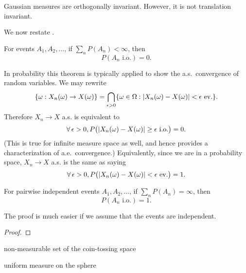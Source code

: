 Gaussian measures are orthogonally invariant. However, it is not translation invariant.

\begin{namedthm}
    
\end{namedthm}

We now restate .

\begin{namedthm} \label{thm:BorelCantelli-1-prob}
    For events $A_1,A_2,\dotsc$, if $\sum_n P(A_n) < \infty$, then \[
        P(A_n \text{ i.o.}) = 0.
    \]
\end{namedthm}

In probability this theorem is typically applied to show the a.s.\ convergence of random variables. We may rewrite \[
    \{\omega: X_n(\omega) \to X(\omega)\} = \bigcap_{\epsilon >0}\{\omega \in \Omega: \lvert X_n(\omega) - X(\omega) \rvert < \epsilon\text{ ev.}\}.
\] Therefore $X_n \to X$ a.s. is equivalent to \[
    \forall\,\epsilon >0, P\bigl(\lvert X_n(\omega) - X(\omega) \rvert \geq \epsilon\text{ i.o.}\bigr) = 0.
\] (This is true for infinite measure space as well, and hence provides a characterization of a.e.\ convergence.) Equivalently, since we are in a probability space, $X_n \to X$ a.s. is the same as saying \[
    \forall\,\epsilon >0, P\bigl(\lvert X_n(\omega) - X(\omega) \rvert < \epsilon\text{ ev.}\bigr) = 1.
\]

\begin{namedthm}
    For pairwise independent events $A_1,A_2,\dotsc$, if $\sum_n P(A_n) = \infty$, then \[
        P(A_n \text{ i.o.}) = 1.
    \]
\end{namedthm}

The proof is much easier if we assume that the events are independent.

\begin{proof}
    
\end{proof}

non-measurable set of the coin-tossing space

uniform measure on the sphere


